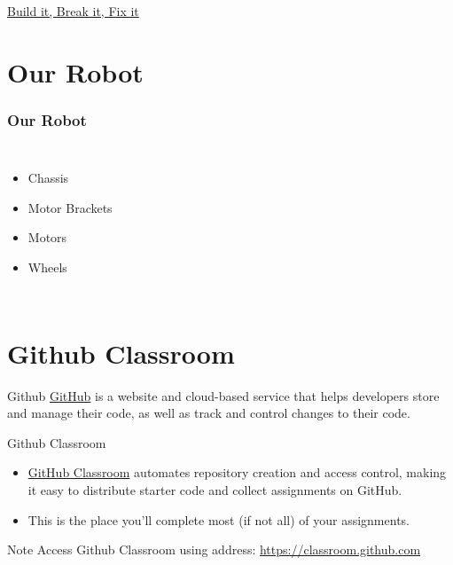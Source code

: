 \documentclass[12pt,letterpaper]{beamer}
\begin{document}
\begin{frame}{}
    \href{https://youtu.be/EezdinoG4mk}{Build it, Break it, Fix it}

\end{frame}


\section{Our Robot}

\begin{frame}
\frametitle{Our Robot}

\begin{columns}


\begin{itemize}
    \item Chassis
    \item Motor Brackets
    \item Motors
    \item Wheels
\end{itemize}
\end{columns}
\end{frame}



\section{Github Classroom}
\begin{frame}{Github}
    \href{https://github.com}{GitHub} is a website and cloud-based service that helps developers store and manage their code, as well as track and control changes to their code. 
\end{frame}

\begin{frame}{Github Classroom}
\begin{itemize}
    \item \href{https://classroom.github.com}{GitHub Classroom} automates repository creation and access control, making it easy to distribute starter code and collect assignments on GitHub.
    \item This is the place you'll complete most (if not all) of your assignments.
\end{itemize}
\begin{alertblock}{Note}
    Access Github Classroom using address: \href{https://classroom.github.com}{https://classroom.github.com}
\end{alertblock}   

\end{frame}
\end{document}
